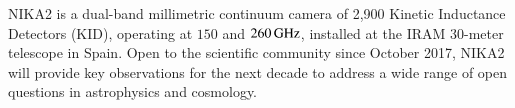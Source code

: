\documentclass[traditionalabstract]{aa}
\begin{document}
%
   \date{Received April XX, 2019; Accepted XXXX XX, 2019}
   \abstract
       {%
         NIKA2 is a dual-band millimetric continuum
         camera of 2,900 Kinetic Inductance Detectors (KID),
         operating at $150$ and $260\,\rm{GHz}$, installed at the IRAM 30-meter
         telescope %
          in Spain.
         Open to the scientific community since October 2017, NIKA2 
         will provide key observations for the next decade to 
         address a wide range of open questions in astrophysics and
         cosmology.}
\end{document}
